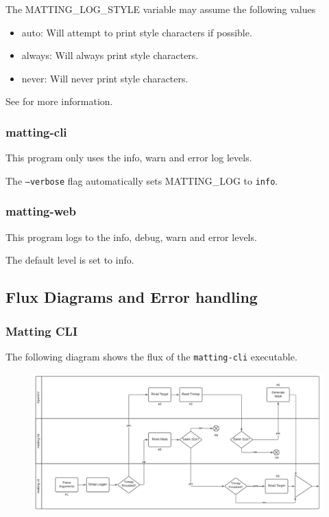 \documentclass[a4paper]{article}
\begin{document}
The \colorbox{gray!10}{MATTING\_LOG\_STYLE} variable may assume the following values
\begin{itemize}
    \item \colorbox{gray!10}{auto}: Will attempt to print style characters if possible.
    \item \colorbox{gray!10}{always}: Will always print style characters.
    \item \colorbox{gray!10}{never}: Will never print style characters.
\end{itemize}
See \cite{envloggingstyle} for more information.

\subsubsection{matting-cli}

This program only uses the \colorbox{gray!10}{info}, \colorbox{gray!10}{warn}
and \colorbox{gray!10}{error} log levels.

The \texttt{--verbose} flag automatically sets \colorbox{gray!10}{MATTING\_LOG}
to \colorbox{gray!10}{\texttt{info}}. \\

\subsubsection{matting-web}

This program logs to the \colorbox{gray!10}{info},
\colorbox{gray!10}{debug},
\colorbox{gray!10}{warn}
and \colorbox{gray!10}{error} levels.

The default level is set to \colorbox{gray!10}{info}.

\pagebreak

\subsection{Flux Diagrams and Error handling}

\subsubsection{Matting CLI}

The following diagram shows the flux of the \texttt{matting-cli} executable.

\begin{figure}[h]
    \includegraphics[width=\textwidth]{media/swimlane/swimlane1.pdf}
\end{figure}
\end{document}
